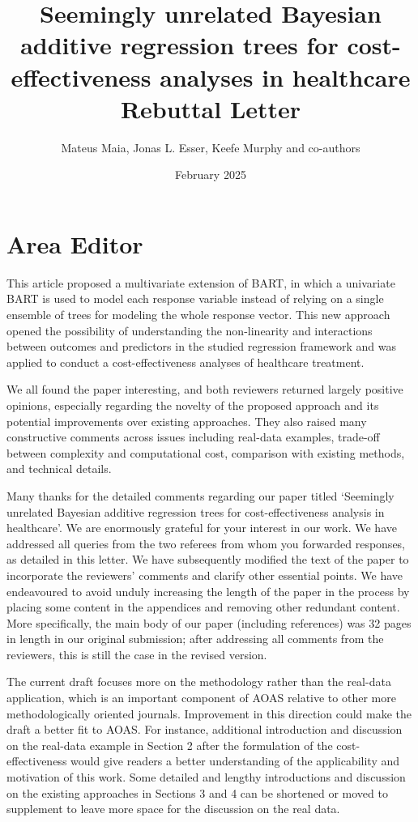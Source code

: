 \documentclass{article}
\title{\vspace{-3em}Seemingly unrelated Bayesian additive regression trees for cost-effectiveness analyses in healthcare\\\medskip\Large{Rebuttal Letter}}
\author{Mateus Maia, Jonas L. Esser, Keefe Murphy and co-authors}
\date{February 2025\vspace{-2em}}
\begin{document}
\maketitle

\section{Area Editor}

\begin{mdframed}
    This article proposed a multivariate extension of BART, in which a univariate BART is used to model each response variable instead of relying on a single ensemble of trees for modeling the whole response vector. This new approach opened the possibility of understanding the non-linearity and interactions between outcomes and predictors in the studied regression framework and was applied to conduct a cost-effectiveness analyses of healthcare treatment.

    We all found the paper interesting, and both reviewers returned largely positive opinions, especially regarding the novelty of the proposed approach and its potential improvements over existing approaches. They also raised many constructive comments across issues including real-data examples, trade-off between complexity and computational cost, comparison with existing methods, and technical details.
\end{mdframed}

Many thanks for the detailed comments regarding our paper titled `Seemingly unrelated Bayesian additive regression trees for cost-effectiveness analysis in healthcare'. We are enormously grateful for your interest in our work. We have addressed all queries from the two referees from whom you forwarded responses, as detailed in this letter. We have subsequently modified the text of the paper to incorporate the reviewers' comments and clarify other essential points. We have endeavoured to avoid unduly increasing the length of the paper in the process by placing some content in the appendices and removing other redundant content. More specifically, the main body of our paper (including references) was 32 pages in length in our original submission; after addressing all comments from the reviewers, this is still the case in the revised version.

\begin{mdframed}
The current draft focuses more on the methodology rather than the real-data application, which is an important component of AOAS relative to other more methodologically oriented journals. Improvement in this direction could make the draft a better fit to AOAS. For instance, additional introduction and discussion on the real-data example in Section 2 after the formulation of the cost-effectiveness would give readers a better understanding of the applicability and motivation of this work. Some detailed and lengthy introductions and discussion on the existing approaches in Sections 3 and 4 can be shortened or moved to supplement to leave more space for the discussion on the real data.
\end{mdframed}
\end{document}
